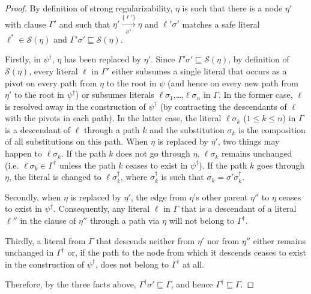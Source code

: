\begin{proof} 
By definition of strong regularizability, $\eta$ is such
that there is a node $\eta'$ with clause $\Gamma'$ and such that
$\eta' \xrightarrow[\sigma']{\{\ell'\} } \eta$ and $\ell'\sigma'$
matches a safe literal $\ell^*\in \mathcal{S}(\eta)$ and
$\Gamma' \sigma' \sqsubseteq \mathcal{S}(\eta)$.

Firstly, in $\psi^{\dagger}$, $\eta$ has been replaced by $\eta'$. Since
$\Gamma' \sigma' \sqsubseteq \mathcal{S}(\eta)$, by definition of
$\mathcal{S}(\eta)$, every literal $\ell$ in $\Gamma'$ either subsumes 
a single literal that occurs as a pivot on every path
from $\eta$ to the root in $\psi$ (and hence on every new path from
$\eta'$ to the root in $\psi^{\dagger}$) or subsumes literals 
$\ell \sigma_1$,\ldots,$\ell\sigma_n$ in $\Gamma$. In the former case,
$\ell$ is resolved away in the construction of $\psi^{\dagger}$ (by
contracting the descendants of $\ell$ with the pivots in each path).
In the latter case, the literal $\ell \sigma_k$ ($1 \leq k \leq n$) in
$\Gamma$ is a descendant of $\ell$ through a path $k$ and the
substitution $\sigma_k$ is the composition of all substitutions on
this path. When $\eta$ is replaced by $\eta'$, two things may happen
to $\ell \sigma_k$. If the path $k$ does not go through $\eta$, 
$\ell \sigma_k$ remains unchanged (i.e. $\ell \sigma_k \in \Gamma^{\dagger}$
unless the path $k$ ceases to exist in $\psi^{\dagger}$). If the path
$k$ goes through $\eta$, the literal is changed to 
$\ell\sigma^{\dagger}_k$, where $\sigma^{\dagger}_k$ is such that 
$\sigma_k = \sigma' \sigma^{\dagger}_k$.

Secondly, when $\eta$ is replaced by $\eta'$, the edge from
$\eta$'s other parent $\eta''$ to $\eta$ ceases to exist in
$\psi^{\dagger}$. Consequently, any literal $\ell$ in $\Gamma$ that is a
descendant of a literal $\ell''$ in the clause of $\eta''$ through a
path via $\eta$ will not belong to $\Gamma^{\dagger}$.

 

Thirdly, a literal from $\Gamma$ that descends neither from $\eta'$ nor from $\eta''$ either remains unchanged in $\Gamma^{\dagger}$ or, if the path to the node from which it descends ceases to exist in the construction of $\psi^{\dagger}$, does not belong to $\Gamma^{\dagger}$ at all.

Therefore, by the three facts above, $\Gamma^{\dagger} \sigma' \sqsubseteq \Gamma$, and hence $\Gamma^{\dagger} \sqsubseteq \Gamma$.
\end{proof}